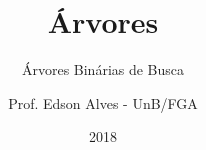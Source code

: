 \title{Árvores}
\subtitle{Árvores Binárias de Busca}
\author{Prof. Edson Alves - UnB/FGA}
\date{2018}
